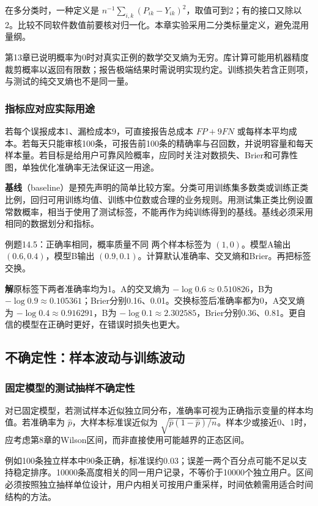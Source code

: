 \documentclass[UTF8,fontset=none,zihao=-4,a4paper]{ctexart}
\newcommand{\term}[1]{\textbf{#1}}
\newcommand{\sol}{\par\noindent\textbf{解}\quad}
\numberwithin{equation}{section}
\numberwithin{figure}{section}
\begin{document}
在多分类时，一种定义是 $n^{-1}\sum_{i,k}(P_{ik}-Y_{ik})^2$，取值可到2；有的接口又除以2。比较不同软件数值前要核对归一化。本章实验采用二分类标量定义，避免混用量纲。

第13章已说明概率为0时对真实正例的数学交叉熵为无穷。库计算可能用机器精度裁剪概率以返回有限数；报告极端结果时需说明实现约定。训练损失若含正则项，与测试的纯交叉熵也不是同一量。

\subsubsection{指标应对应实际用途}
若每个误报成本1、漏检成本9，可直接报告总成本 $FP+9FN$ 或每样本平均成本。若每天只能审核100条，可报告前100条的精确率与召回数，并说明容量和每天样本量。若目标是给用户可靠风险概率，应同时关注对数损失、Brier和可靠性图，单独优化准确率无法保证这一用途。

\term{基线}（baseline）是预先声明的简单比较方案。分类可用训练集多数类或训练正类比例，回归可用训练均值、训练中位数或合理的业务规则。用测试集正类比例设置常数概率，相当于使用了测试标签，不能再作为纯训练得到的基线。基线必须采用相同的数据划分和指标。

\begin{infobox}[unbreakable]{例题14.5：正确率相同，概率质量不同}
两个样本标签为 $(1,0)$。模型A输出 $(0.6,0.4)$，模型B输出 $(0.9,0.1)$。计算默认准确率、交叉熵和Brier。再把标签交换。
\sol 原标签下两者准确率均为1。A的交叉熵为 $-\log0.6\approx0.510826$，B为 $-\log0.9\approx0.105361$；Brier分别0.16、0.01。交换标签后准确率都为0，A交叉熵为 $-\log0.4\approx0.916291$，B为 $-\log0.1\approx2.302585$，Brier分别0.36、0.81。更自信的模型在正确时更好，在错误时损失也更大。
\end{infobox}

\subsection{不确定性：样本波动与训练波动}
\subsubsection{固定模型的测试抽样不确定性}
对已固定模型，若测试样本近似独立同分布，准确率可视为正确指示变量的样本均值。若准确率为 $\widehat p$，大样本标准误近似为 $\sqrt{\widehat p(1-\widehat p)/n}$。样本少或接近0、1时，应考虑第8章的Wilson区间，而非直接使用可能越界的正态区间。

例如100条独立样本中90条正确，标准误约0.03；误差一两个百分点可能不足以支持稳定排序。10000条高度相关的同一用户记录，不等价于10000个独立用户。区间必须按照独立抽样单位设计，用户内相关可按用户重采样，时间依赖需用适合时间结构的方法。
\end{document}
